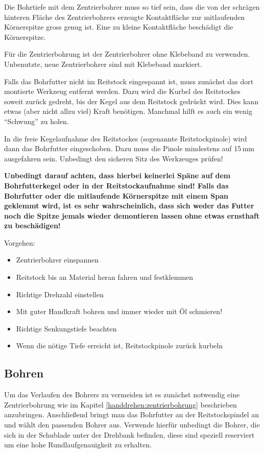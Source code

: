 \documentclass{\basedir/fablab-document}
\begin{document}
Die Bohrtiefe mit dem Zentrierbohrer muss so tief sein, dass die von der schrägen hinteren Fläche des Zentrierbohrers erzeugte Kontaktfläche zur mitlaufenden Körnerspitze gross genug ist. Eine zu kleine Kontaktfläche beschädigt die Körnerspitze.

Für die Zentrierbohrung ist der Zentrierbohrer ohne Klebeband zu verwenden.
Unbenutzte, neue Zentrierbohrer sind mit Klebeband markiert.

Falls das Bohrfutter nicht im Reitstock eingespannt ist, muss zunächst das dort montierte Werkzeug entfernt werden.
Dazu wird die Kurbel des Reitstockes soweit zurück gedreht, bis der  Kegel aus dem Reitstock gedrückt wird.
Dies kann etwas (aber nicht allzu viel) Kraft benötigen.
Manchmal hilft es auch ein wenig \enquote{Schwung} zu holen.

In die freie Kegelaufnahme des Reitstockes (sogenannte Reitstockpinole) wird dann das Bohrfutter eingeschoben.
Dazu muss die Pinole mindestens auf 15\,mm ausgefahren sein.
Unbedingt den sicheren Sitz des Werkzeuges prüfen!

\textbf{Unbedingt darauf achten, dass hierbei keinerlei Späne auf dem Bohrfutterkegel oder in der Reitstockaufnahme sind! Falls das Bohrfutter oder die mitlaufende Körnerspitze mit einem Span geklemmt wird, ist es sehr wahrscheinlich, dass sich weder das Futter noch die Spitze jemals wieder demontieren lassen ohne etwas ernsthaft zu beschädigen!}

Vorgehen:
\begin{itemize}
\item Zentrierbohrer einspannen
\item Reitstock bis an Material heran fahren und festklemmen
\item Richtige Drehzahl einstellen
\item Mit guter Handkraft bohren und immer wieder mit Öl schmieren!
\item Richtige Senkungstiefe beachten
\item Wenn die nötige Tiefe erreicht ist, Reitstockpinole zurück kurbeln

\end{itemize}

\subsection{Bohren}

Um das Verlaufen des Bohrers zu vermeiden ist es zunächst notwendig eine Zentrierbohrung wie im Kapitel \ref{handdrehen:zentrierbohrung} beschrieben anzubringen.
Anschließend bringt man das Bohrfutter an der Reitstockspindel an und wählt den passenden Bohrer aus.
Verwende hierfür unbedingt die Bohrer, die sich in der Schublade unter der Drehbank befinden, diese sind speziell reserviert um eine hohe Rundlaufgenauigkeit zu erhalten.
\end{document}
